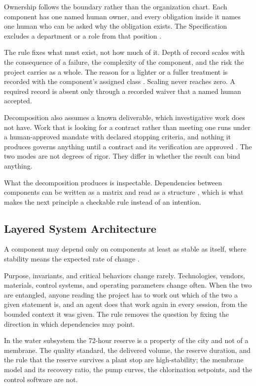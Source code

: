 Ownership follows the boundary rather than the organization chart. Each component has one named human owner, and every obligation inside it names one human who can be asked why the obligation exists. The Specification excludes a department or a role from that position \citep[Section~\hyperlink{nss-6.7}{6.7}]{pss2026}.

The rule fixes what must exist, not how much of it. Depth of record scales with the consequence of a failure, the complexity of the component, and the risk the project carries as a whole. The reason for a lighter or a fuller treatment is recorded with the component's assigned class \citep[Sections~\hyperlink{nss-1.6}{1.6} and~\hyperlink{nss-7.10}{7.10}]{pss2026}. Scaling never reaches zero. A required record is absent only through a recorded waiver that a named human accepted.

Decomposition also assumes a known deliverable, which investigative work does not have. Work that is looking for a contract rather than meeting one runs under a human-approved mandate with declared stopping criteria, and nothing it produces governs anything until a contract and its verification are approved \citep[Sections~\hyperlink{nss-5.7}{5.7} and~\hyperlink{nss-6.13}{6.13}]{pss2026}. The two modes are not degrees of rigor. They differ in whether the result can bind anything.

What the decomposition produces is inspectable. Dependencies between components can be written as a matrix and read as a structure \citep{steward1981}, which is what makes the next principle a checkable rule instead of an intention.

\subsection{Layered System Architecture}

A component may depend only on components at least as stable as itself, where stability means the expected rate of change \citep{tbf2026,martin2002}.

Purpose, invariants, and critical behaviors change rarely. Technologies, vendors, materials, control systems, and operating parameters change often. When the two are entangled, anyone reading the project has to work out which of the two a given statement is, and an agent does that work again in every session, from the bounded context it was given. The rule removes the question by fixing the direction in which dependencies may point.

In the water subsystem the 72-hour reserve is a property of the city and not of a membrane. The quality standard, the delivered volume, the reserve duration, and the rule that the reserve survives a plant stop are high-stability; the membrane model and its recovery ratio, the pump curves, the chlorination setpoints, and the control software are not.

